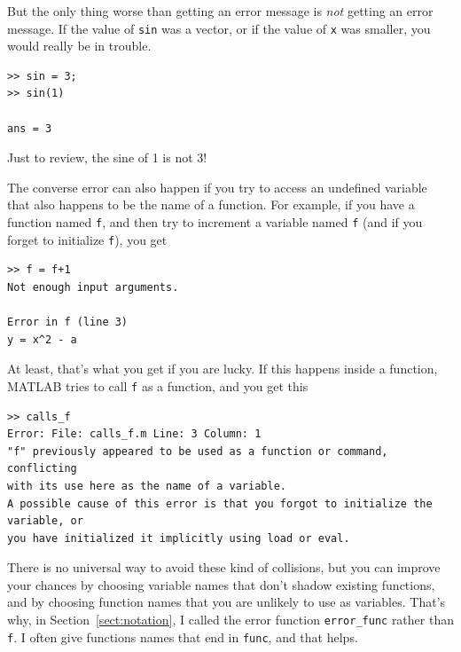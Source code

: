 \documentclass[
]{book}
\begin{document}
But the only thing worse than getting an error message is {\em not}
getting an error message.  If the value of {\tt sin} was a vector,
or if the value of {\tt x} was smaller, you would really
be in trouble.

\begin{verbatim}
>> sin = 3;
>> sin(1)

ans = 3
\end{verbatim}

Just to review, the sine of 1 is not 3!

The converse error can also happen if you try to access an
undefined variable that also happens to be the name of a function.
For example, if you have a function named {\tt f}, and then
try to increment a variable named {\tt f} (and if you forget to
initialize {\tt f}), you get

\begin{verbatim}
>> f = f+1
Not enough input arguments.

Error in f (line 3)
y = x^2 - a
\end{verbatim}

At least, that's what you get if you are lucky.  If this happens
inside a function, MATLAB tries to call {\tt f} as a function,
and you get this


\begin{verbatim}
>> calls_f
Error: File: calls_f.m Line: 3 Column: 1
"f" previously appeared to be used as a function or command, conflicting 
with its use here as the name of a variable.
A possible cause of this error is that you forgot to initialize the variable, or 
you have initialized it implicitly using load or eval.

\end{verbatim}

There is no universal way to avoid these kind of
collisions, but you can improve your chances by choosing
variable names that don't shadow existing functions, and by
choosing function names that you are unlikely to use as variables.
That's why, in Section~\ref{sect:notation}, I called the error function
{\tt error\_func} rather than {\tt f}.  I often give functions
names that end in {\tt func}, and that helps.
\end{document}
